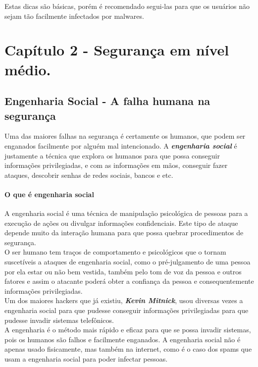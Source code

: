 \documentclass[12pt, letterpaper, DejaVuSansMono:12]{report}
\begin{document}
	Estas dicas são básicas, porém é recomendado segui-las para que os usuários não sejam tão facilmente infectados por malwares.\\

\pagebreak

\part{Capítulo 2 - Segurança em nível médio.}

\chapter{Engenharia Social - A falha humana na segurança}
	Uma das maiores falhas na segurança é certamente os humanos, que podem ser enganados facilmente por alguém mal intencionado. A \textbf{\textit{engenharia social}} é justamente a técnica que explora os humanos para que possa conseguir informações privilegiadas, e com as informações em mãos, conseguir fazer ataques, descobrir senhas de redes sociais, bancos e etc.\\

\subsection{O que é engenharia social}
	A engenharia social é uma técnica de manipulação psicológica de pessoas para a execução de ações ou divulgar informações confidenciais. Este tipo de ataque depende muito da interação humana para que possa quebrar procedimentos de segurança.\\
	O ser humano tem traços de comportamento e psicológicos que o tornam suscetíveis a ataques de engenharia social, como o pré-julgamento de uma pessoa por ela estar ou não bem vestida, também pelo tom de voz da pessoa e outros fatores e assim o atacante poderá obter a confiança da pessoa e consequentemente informações privilegiadas.\\

	Um dos maiores hackers que já existiu, \textbf{\textit{Kevin Mitnick}}, usou diversas vezes a engenharia social para que pudesse conseguir informações privilegiadas para que pudesse invadir sistemas telefônicos.\\

	A engenharia é o método mais rápido e eficaz para que se possa invadir sistemas, pois os humanos são falhos e facilmente enganados. A engenharia social não é apenas usado fisicamente, mas também na internet, como é o caso dos spams que usam a engenharia social para poder infectar pessoas.\\
\end{document}
